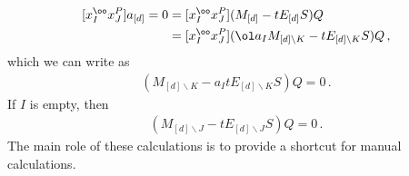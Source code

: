 \begin{align}\begin{split}
	 [x_I^\oo x_J^P] a_{[d]} = 0 &= [x_I^\oo x_J^P](M_{[d]} - tE_{[d]}S)Q \\
	 &= [x_I^\oo x_J^P](\ol a_{I} M_{[d]\backslash K} - t E_{[d]\backslash K} S)Q\,,
\end{split}\end{align}
which we can write as
\begin{align}
	[x_I^\oo x_J^P]( M_{[d]\backslash K} - a_I t E_{[d]\backslash K} S)Q = 0\,.
\end{align}
If $I$ is empty, then
\begin{align}
	[x_J^P]( M_{[d]\backslash J} - t E_{[d]\backslash J} S)Q = 0\,.
\end{align}
The main role of these calculations is to provide a shortcut for manual calculations.

